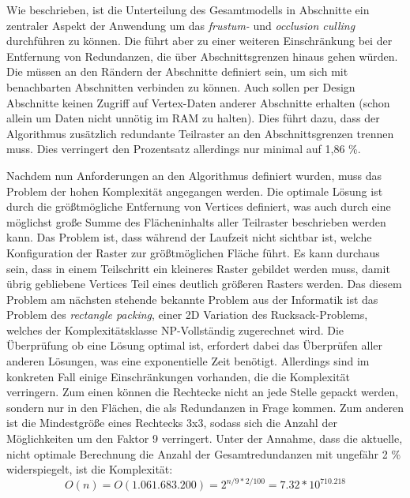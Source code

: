 Wie beschrieben, ist die Unterteilung des Gesamtmodells in Abschnitte ein zentraler Aspekt der Anwendung um das \textit{frustum-} und \textit{occlusion culling} durchführen zu können. Die führt aber zu einer weiteren Einschränkung bei der Entfernung von Redundanzen, die über Abschnittsgrenzen hinaus gehen würden. Die müssen an den Rändern der Abschnitte definiert sein, um sich mit benachbarten Abschnitten verbinden zu können. Auch sollen per Design Abschnitte keinen Zugriff auf Vertex-Daten anderer Abschnitte erhalten (schon allein um Daten nicht unnötig im RAM zu halten). Dies führt dazu, dass der Algorithmus zusätzlich redundante Teilraster an den Abschnittsgrenzen trennen muss. Dies verringert den Prozentsatz allerdings nur minimal auf 1,86 \%.

Nachdem nun Anforderungen an den Algorithmus definiert wurden, muss das Problem der hohen Komplexität angegangen werden. Die optimale Lösung ist durch die größtmögliche Entfernung von Vertices definiert, was auch durch eine möglichst große Summe des Flächeninhalts aller Teilraster beschrieben werden kann. Das Problem ist, dass während der Laufzeit nicht sichtbar ist, welche Konfiguration der Raster zur größtmöglichen Fläche führt. Es kann durchaus sein, dass in einem Teilschritt ein kleineres Raster gebildet werden muss, damit übrig gebliebene Vertices Teil eines deutlich größeren Rasters werden. Das diesem Problem am nächsten stehende bekannte Problem aus der Informatik ist das Problem des \textit{rectangle packing}, einer 2D Variation des Rucksack-Problems, welches der Komplexitätsklasse NP-Vollständig zugerechnet wird. Die Überprüfung ob eine Lösung optimal ist, erfordert dabei das Überprüfen aller anderen Lösungen, was eine exponentielle Zeit benötigt. Allerdings sind im konkreten Fall einige Einschränkungen vorhanden, die die Komplexität verringern. Zum einen können die Rechtecke nicht an jede Stelle gepackt werden, sondern nur in den Flächen, die als Redundanzen in Frage kommen. Zum anderen ist die Mindestgröße eines Rechtecks 3x3, sodass sich die Anzahl der Möglichkeiten um den Faktor 9 verringert. Unter der Annahme, dass die aktuelle, nicht optimale Berechnung die Anzahl der Gesamtredundanzen mit ungefähr 2 \% widerspiegelt, ist die Komplexität: \[O(n) = O(1.061.683.200) = 2^{n / 9 * 2 / 100} = 7.32 * 10^{710.218}\]

